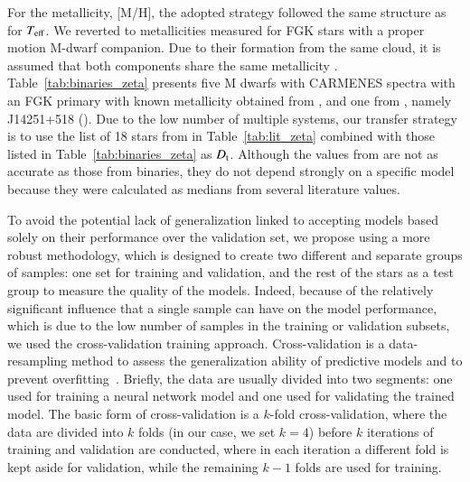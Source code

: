 \documentclass{aa}
\begin{document}
For {the metallicity}, [M/H], the adopted strategy followed the same structure as for $T_{\rm eff}$. We reverted to metallicities measured for FGK stars with a proper motion M-dwarf companion. Due to their formation from the same cloud, it is assumed that both components share the same metallicity \citep{Desidera2006,Andrews2018}. Table~\ref{tab:binaries_zeta} presents five M dwarfs with CARMENES spectra with an FGK primary with known metallicity obtained from \cite{Montes2018}, and one from \cite{Tabernero2022}, namely J14251+518 ().
Due to the low number of multiple systems, our transfer strategy is to use the list of 18 stars from \cite{Passegger2022} in Table~\ref{tab:lit_zeta} combined with those listed in Table~\ref{tab:binaries_zeta} as $D_{\rm t}$. Although the values from \cite{Passegger2022} are not as accurate as those from binaries, they {do not depend strongly on a specific model} because they were calculated as medians from several literature values.

To avoid the potential lack of generalization linked to accepting models based solely on their performance over the validation set, we propose using a more robust methodology, which is designed to create two different and separate groups of samples: one set for training and validation, and the rest of the stars as a test group to measure the quality of the models.
Indeed, because of the relatively significant influence that a single sample can have on the model performance, which is due to the low number of samples in the training or validation subsets, we used the cross-validation training approach. Cross-validation is a data-resampling method to assess the generalization ability of predictive models and to prevent overfitting~\citep{refaeilzadeh2009cross}. Briefly, the data are usually divided into two segments: one used for training a neural network model and one used for validating the trained model. The basic form of cross-validation is a $k$-fold cross-validation, where the data are divided into $k$ folds (in our case, we set $k=4$) before $k$ iterations of training and validation are conducted, where in each iteration a different fold is kept aside for validation, while the remaining $k-1$ folds are used for training.
\end{document}
